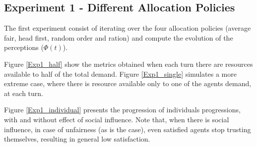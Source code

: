 \documentclass[conference,compsoc]{IEEEtran}
\begin{document}
\subsection{Experiment 1 - Different Allocation Policies}


The first experiment consist of iterating over the four allocation policies (average fair, head first, random order and ration) and compute the evolution of the perceptions ($\Phi(t)$).

Figure \ref{Exp1_half} show the metrics obtained when each turn there are resources available to half of the total demand. Figure \ref{Exp1_single} simulates a more extreme case, where there is resource available only to one of the agents demand, at each turn.







Figure \ref{Exp1_individual} presents the progression of individuals progressions, with and without effect of social influence. Note that, when there is social influence, in case of unfairness (as is the case), even satisfied agents stop trusting themselves, resulting in general low satisfaction.
\end{document}
